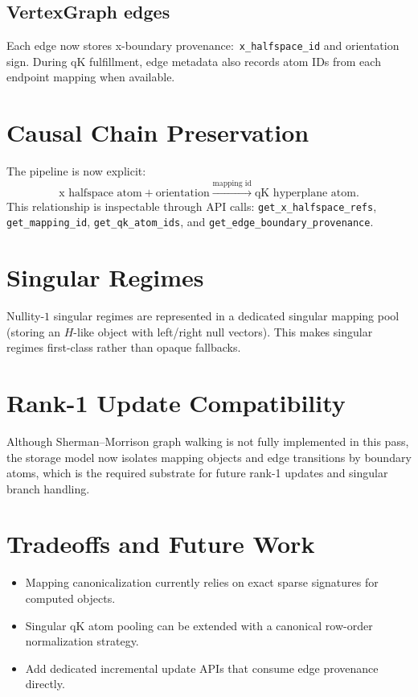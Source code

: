 \documentclass[11pt]{article}
\begin{document}
\subsection{VertexGraph edges}
Each edge now stores x-boundary provenance:\ \texttt{x\_halfspace\_id} and orientation sign. During qK fulfillment, edge metadata also records atom IDs from each endpoint mapping when available.

\section{Causal Chain Preservation}
The pipeline is now explicit:
\[
\text{x halfspace atom} + \text{orientation}
\xrightarrow{\text{mapping id}}
\text{qK hyperplane atom}.
\]
This relationship is inspectable through API calls:
\texttt{get\_x\_halfspace\_refs}, \texttt{get\_mapping\_id}, \texttt{get\_qk\_atom\_ids}, and \texttt{get\_edge\_boundary\_provenance}.

\section{Singular Regimes}
Nullity-$1$ singular regimes are represented in a dedicated singular mapping pool (storing an $H$-like object with left/right null vectors). This makes singular regimes first-class rather than opaque fallbacks.

\section{Rank-1 Update Compatibility}
Although Sherman--Morrison graph walking is not fully implemented in this pass, the storage model now isolates mapping objects and edge transitions by boundary atoms, which is the required substrate for future rank-1 updates and singular branch handling.

\section{Tradeoffs and Future Work}
\begin{itemize}
  \item Mapping canonicalization currently relies on exact sparse signatures for computed objects.
  \item Singular qK atom pooling can be extended with a canonical row-order normalization strategy.
  \item Add dedicated incremental update APIs that consume edge provenance directly.
\end{itemize}
\end{document}
